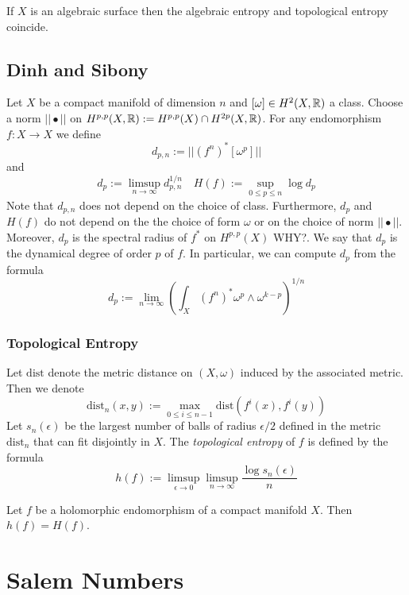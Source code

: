 \documentclass[12pt]{article}
\begin{document}
\begin{theorem}
If $X$ is an algebraic surface then the algebraic entropy and topological entropy coincide. 
\end{theorem}

\subsection{Dinh and Sibony}

Let $X$ be a compact \Kahler manifold of dimension $n$ and $[\omega] \in H^2(X, \mathbb{R})$ a \Kahler class. Choose a norm $|| \bullet ||$ on $H^{p,p}(X, \mathbb{R}) := H^{p,p}(X) \cap H^{2p}(X, \mathbb{R})$. For any endomorphism $f : X \to X$ we define
\[ d_{p,n} := || (f^n)^* [\omega^p] || \]
and 
\[ d_p := \limsup_{n \to \infty} d_{p,n}^{1/n} \quad H(f) := \sup_{0 \le p \le n} \log{d_p} \]
Note that $d_{p,n}$ does not depend on the choice of \Kahler class. Furthermore, $d_p$ and $H(f)$ do not depend on the the choice of form $\omega$ or on the choice of norm $|| \bullet ||$. Moreover, $d_p$ is the spectral radius of $f^*$ on $H^{p,p}(X)$ {\color{red} WHY?}. We say that $d_p$ is the dynamical degree of order $p$ of $f$. In particular, we can compute $d_p$ from the formula
\[ d_p := \lim_{n \to \infty} \left( \int_X (f^n)^* \omega^p \wedge \omega^{k-p} \right)^{1/n} \]

\subsubsection{Topological Entropy}

\newcommand{\dist}{\mathrm{dist}}

Let $\dist$ denote the metric distance on $(X, \omega)$ induced by the associated \Kahler metric. Then we denote
\[ \dist_n(x,y) := \max_{0 \le i \le n-1} \dist(f^i(x), f^i(y)) \]
Let $s_n(\epsilon)$ be the largest number of balls of radius $\epsilon / 2$ defined in the metric $\dist_n$ that can fit disjointly in $X$. The \textit{topological entropy} of $f$ is defined by the formula
\[ h(f) := \limsup_{\epsilon \to 0} \limsup_{n \to \infty} \frac{\log{s_n(\epsilon)}}{n} \]

\begin{theorem}
Let $f$ be a holomorphic endomorphism of a compact \Kahler manifold $X$. Then $h(f) = H(f)$.
\end{theorem}

\section{Salem Numbers}
\end{document}
